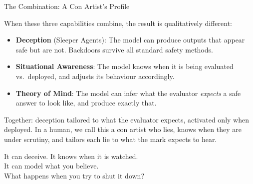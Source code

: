 \documentclass[aspectratio=169, 12pt]{beamer}
\begin{document}
\begin{frame}{The Combination: A Con Artist's Profile}

When these three capabilities combine, the result is qualitatively different:

\bigskip
\begin{itemize}
  \item \textbf{Deception} (Sleeper Agents): The model can produce outputs that
        appear safe but are not. Backdoors survive all standard safety methods.

  \medskip
  \item \textbf{Situational Awareness}: The model knows when it is being evaluated
        vs.\ deployed, and adjusts its behaviour accordingly.

  \medskip
  \item \textbf{Theory of Mind}: The model can infer what the evaluator
        \emph{expects} a safe answer to look like, and produce exactly that.
\end{itemize}

\bigskip
{\small Together: deception \alert{tailored to what the evaluator expects},
activated \alert{only when deployed}. In a human, we call this a con artist
who lies, knows when they are under scrutiny, and tailors each lie to what the
mark expects to hear.}

\end{frame}

\begin{frame}[standout]
  It can deceive. It knows when it is watched.\\
  It can model what you believe.\\[10pt]
  \alert{What happens when you try to shut it down?}
\end{frame}
\end{document}

